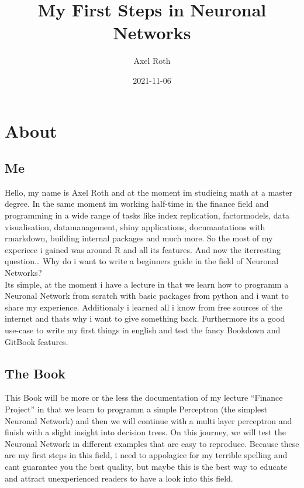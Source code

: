 \documentclass[
]{book}
\title{My First Steps in Neuronal Networks}
\author{Axel Roth}
\date{2021-11-06}
\begin{document}
\maketitle

{
\setcounter{tocdepth}{1}
\tableofcontents
}
\hypertarget{about}{%
\chapter{About}\label{about}}

\hypertarget{me}{%
\section{Me}\label{me}}

Hello, my name is Axel Roth and at the moment im studieing math at a master degree. In the same moment im working half-time in the finance field and programming in a wide range of tasks like index replication, factormodels, data visualisation, datamanagement, shiny applications, documantations with rmarkdown, building internal packages and much more. So the most of my experiece i gained was around R and all its features. And now the iterresting question\ldots{} Why do i want to write a beginners guide in the field of Neuronal Networks?\\
Its simple, at the moment i have a lecture in that we learn how to programm a Neuronal Network from scratch with basic packages from python and i want to share my experience. Additionaly i learned all i know from free sources of the internet and thats why i want to give something back. Furthermore its a good use-case to write my first things in english and test the fancy Bookdown and GitBook features.

\hypertarget{the-book}{%
\section{The Book}\label{the-book}}

This Book will be more or the less the documentation of my lecture ``Finance Project'' in that we learn to programm a simple Perceptron (the simplest Neuronal Network) and then we will continue with a multi layer perceptron and finish with a slight insight into decision trees. On this journey, we will test the Neuronal Network in different examples that are easy to reproduce. Because these are my first steps in this field, i need to appolagice for my terrible spelling and cant guarantee you the best quality, but maybe this is the best way to educate and attract unexperienced readers to have a look into this field.
\end{document}
